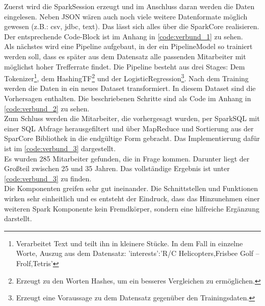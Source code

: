 \noindent
Zuerst wird die SparkSession erzeugt und im Anschluss daran werden die Daten eingelesen. Neben JSON wären auch noch viele weitere Datenformate möglich gewesen (z.B.: csv, jdbc, text). Das lässt sich alles über die SparkCore realisieren. Der entsprechende Code-Block ist im Anhang in \autoref{code:verbund_1} zu sehen.\\

\noindent
Als nächstes wird eine Pipeline aufgebaut, in der ein PipelineModel so trainiert werden soll, dass es später aus dem Datensatz alle passenden Mitarbeiter mit möglichst hoher Trefferrate findet. Die Pipeline besteht aus drei Stages: Dem Tokenizer\footnote{Verarbeitet Text und teilt ihn in kleinere Stücke. In dem Fall in einzelne Worte, Auszug aus dem Datensatz: 'interests':'R/C Helicopters,Frisbee Golf – Frolf,Tetris'}, dem HashingTF\footnote{Erzeugt zu den Worten Hashes, um ein besseres Vergleichen zu ermöglichen.} und der LogisticRegression\footnote{Erzeugt eine Voraussage zu dem Datensatz gegenüber den Trainingsdaten.}. Nach dem Training werden die Daten in ein neues Dataset transformiert. In diesem Dataset sind die Vorhersagen enthalten. Die beschriebenen Schritte sind als Code im Anhang in \autoref{code:verbund_2} zu sehen. \\

\noindent
Zum Schluss werden die Mitarbeiter, die vorhergesagt wurden, per SparkSQL mit einer SQL Abfrage herausgefiltert und über MapReduce und Sortierung aus der SparCore Bibliothek in die endgültige Form gebracht. Das Implementierung dafür ist im \autoref{code:verbund_3} dargestellt. \\

\noindent
Es wurden 285 Mitarbeiter gefunden, die in Frage kommen. Darunter liegt der Großteil zwischen 25 und 35 Jahren. Das vollständige Ergebnis ist unter \autoref{code:verbund_3} zu finden.\\

\noindent
Die Komponenten greifen sehr gut ineinander. Die Schnittstellen und Funktionen wirken sehr einheitlich und es entsteht der Eindruck, dass das Hinzunehmen einer weiteren Spark Komponente kein Fremdkörper, sondern eine hilfreiche Ergänzung darstellt.

 








